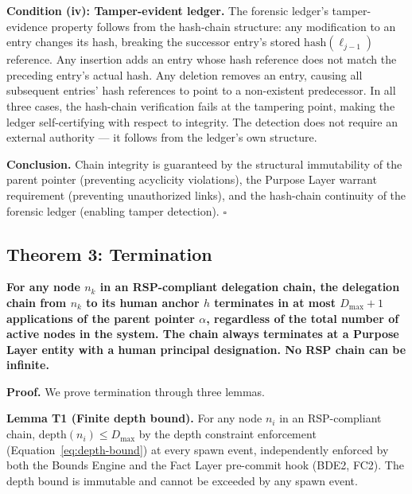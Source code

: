 \medskip
\noindent\textbf{Condition (iv): Tamper-evident ledger.} The forensic ledger's tamper-evidence property follows from the hash-chain structure: any modification to an entry changes its hash, breaking the successor entry's stored $\text{hash}(\ell_{j-1})$ reference. Any insertion adds an entry whose hash reference does not match the preceding entry's actual hash. Any deletion removes an entry, causing all subsequent entries' hash references to point to a non-existent predecessor. In all three cases, the hash-chain verification fails at the tampering point, making the ledger self-certifying with respect to integrity. The detection does not require an external authority --- it follows from the ledger's own structure.

\medskip
\noindent\textbf{Conclusion.} Chain integrity is guaranteed by the structural immutability of the parent pointer (preventing acyclicity violations), the Purpose Layer warrant requirement (preventing unauthorized links), and the hash-chain continuity of the forensic ledger (enabling tamper detection). $\square$

\subsection{Theorem 3: Termination}
\label{sec:rs-thm-termination}

\begin{tcolorbox}[colback=blue!5, colframe=blue, title={Theorem 3 (Termination)}]
\textbf{For any node $n_k$ in an RSP-compliant delegation chain, the delegation chain from $n_k$ to its human anchor $h$ terminates in at most $D_{\max} + 1$ applications of the parent pointer $\alpha$, regardless of the total number of active nodes in the system. The chain always terminates at a Purpose Layer entity with a human principal designation. No RSP chain can be infinite.}
\end{tcolorbox}

\medskip
\noindent\textbf{Proof.} We prove termination through three lemmas.

\medskip
\noindent\textbf{Lemma T1 (Finite depth bound).} For any node $n_i$ in an RSP-compliant chain, $\text{depth}(n_i) \leq D_{\max}$ by the depth constraint enforcement (Equation~\ref{eq:depth-bound}) at every spawn event, independently enforced by both the Bounds Engine and the Fact Layer pre-commit hook (BDE2, FC2). The depth bound is immutable and cannot be exceeded by any spawn event.

